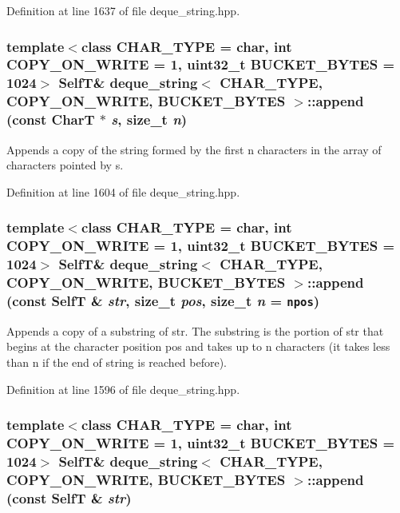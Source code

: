 Definition at line 1637 of file deque\_\-string.hpp.\hypertarget{classdeque__string_b3efd86d189fba40ab8587cbfb9b22a0}{
\subsubsection[{append}]{\setlength{\rightskip}{0pt plus 5cm}template$<$class CHAR\_\-TYPE  = char, int COPY\_\-ON\_\-WRITE = 1, uint32\_\-t BUCKET\_\-BYTES = 1024$>$ {\bf SelfT}\& {\bf deque\_\-string}$<$ CHAR\_\-TYPE, COPY\_\-ON\_\-WRITE, BUCKET\_\-BYTES $>$::append (const CharT $\ast$ {\em s}, \/  size\_\-t {\em n})}}
\label{classdeque__string_b3efd86d189fba40ab8587cbfb9b22a0}


Appends a copy of the string formed by the first n characters in the array of characters pointed by s. 

Definition at line 1604 of file deque\_\-string.hpp.\hypertarget{classdeque__string_126a9388b25ceecb1c4ad3bc4ac4b087}{
\subsubsection[{append}]{\setlength{\rightskip}{0pt plus 5cm}template$<$class CHAR\_\-TYPE  = char, int COPY\_\-ON\_\-WRITE = 1, uint32\_\-t BUCKET\_\-BYTES = 1024$>$ {\bf SelfT}\& {\bf deque\_\-string}$<$ CHAR\_\-TYPE, COPY\_\-ON\_\-WRITE, BUCKET\_\-BYTES $>$::append (const {\bf SelfT} \& {\em str}, \/  size\_\-t {\em pos}, \/  size\_\-t {\em n} = {\tt {\bf npos}})}}
\label{classdeque__string_126a9388b25ceecb1c4ad3bc4ac4b087}


Appends a copy of a substring of str. The substring is the portion of str that begins at the character position pos and takes up to n characters (it takes less than n if the end of string is reached before). 

Definition at line 1596 of file deque\_\-string.hpp.\hypertarget{classdeque__string_5e906ef1d178767fdf3c0058f5eeed55}{
\subsubsection[{append}]{\setlength{\rightskip}{0pt plus 5cm}template$<$class CHAR\_\-TYPE  = char, int COPY\_\-ON\_\-WRITE = 1, uint32\_\-t BUCKET\_\-BYTES = 1024$>$ {\bf SelfT}\& {\bf deque\_\-string}$<$ CHAR\_\-TYPE, COPY\_\-ON\_\-WRITE, BUCKET\_\-BYTES $>$::append (const {\bf SelfT} \& {\em str})}}
\label{classdeque__string_5e906ef1d178767fdf3c0058f5eeed55}



